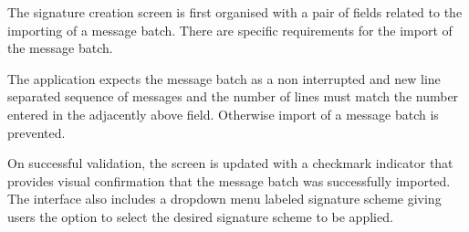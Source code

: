 \documentclass[]{final_report}
\begin{document}
The signature creation screen is first organised with a pair of fields related to the importing of a message batch. There are specific requirements for the import of the message batch. 

The application expects the message batch as a non interrupted and new line separated sequence of messages and the number of lines must match the number entered in the adjacently above field. Otherwise import of a message batch is prevented.

On successful validation, the screen is updated with a checkmark indicator that provides visual confirmation that the message batch was successfully imported. The interface also includes a dropdown menu labeled signature scheme giving users the option to select the desired signature scheme  to be applied. 

\begin{figure}[H]
    \centering %
    

\end{figure}
\end{document}
